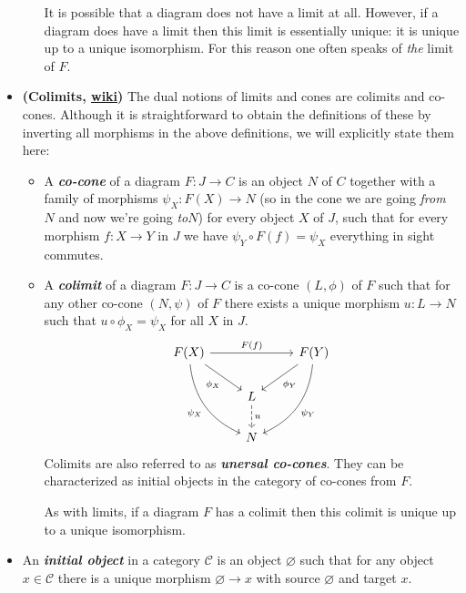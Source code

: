 \documentclass{article}
\newcommand{\Cc}{\mathcal{C}}
\begin{document}
\begin{defn}
\begin{itemize}
\begin{itemize}
			It is possible that a diagram does not have a limit at all. However, if a diagram does have a limit then this limit is essentially unique: it is unique up to a unique isomorphism. For this reason one often speaks of \textit{the} limit of $F$.
		\end{itemize}
		\item \textbf{(Colimits, \href{https://en.wikipedia.org/wiki/Limit_(category_theory)}{wiki})} The dual notions of limits and cones are colimits and co-cones. Although it is straightforward to obtain the definitions of these by inverting all morphisms in the above definitions, we will explicitly state them here:
		\begin{itemize}
			\item A \textbf{\textit{co-cone}} of a diagram $F:J\to C$ is an object $N$ of $C$ together with a family of morphisms $\psi_X:F(X)\to N$  {\color{persiangreen}(so in the cone we are going \textit{from} $N$ and now we're going \textit{to}$N$)} for every object $X$ of $J$, such that for every morphism $f:X\to Y$ in $J$ we have $\psi_Y\circ F(f)=\psi_X$ {\color{persiangreen}everything in sight commutes}.
			
			\item A \textbf{\textit{colimit}} of a diagram $F:J\to C$ is a co-cone $(L,\phi)$ of $F$ such that for any other co-cone $(N,\psi)$ of $F$ there exists a unique morphism $u:L\to N$ such that $u\circ \phi_X=\psi_X$ for all $X$ in $J$.
			\[\begin{tikzcd}
				F(X)\arrow[rr,"F(f)"]\arrow[dr,"\phi_X",swap]\arrow[ddr,bend right,"\psi_X",swap]&&F(Y)\arrow[ld,"\phi_Y"]\arrow[ddl,"\psi_Y",bend left]\\
				&L\arrow[d,dashed,"u"]\\
				&N
			\end{tikzcd}\]
			Colimits are also referred to as \textbf{\textit{unersal co-cones}}. They can be characterized as initial objects in the category of co-cones from $F$.
			
			As with limits, if a diagram $F$ has a colimit then this colimit is unique up to a unique isomorphism.
		\end{itemize}
		\item An \textbf{\textit{initial object}} in a category $\Cc$ is an object $\varnothing$ such that for any object $x\in\Cc$ there is a unique morphism $\varnothing\to x$ with source $\varnothing$ and target $x$.
		

\end{itemize}
\end{defn}
\end{document}
